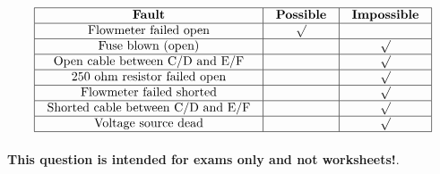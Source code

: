 






$$\vbox{\offinterlineskip
\halign{\strut
\vrule \quad\hfil # \ \hfil & 
\vrule \quad\hfil # \ \hfil & 
\vrule \quad\hfil # \ \hfil \vrule \cr
\noalign{\hrule}
%
{\bf Fault} & {\bf Possible} & {\bf Impossible} \cr
%
\noalign{\hrule}
%
Flowmeter failed open & $\surd$ &  \cr
%
\noalign{\hrule}
%
Fuse blown (open) &  & $\surd$ \cr
%
\noalign{\hrule}
%
Open cable between C/D and E/F &  & $\surd$ \cr
%
\noalign{\hrule}
%
250 ohm resistor failed open &  & $\surd$ \cr
%
\noalign{\hrule}
%
Flowmeter failed shorted &  & $\surd$ \cr
%
\noalign{\hrule}
%
Shorted cable between C/D and E/F &  & $\surd$ \cr
%
\noalign{\hrule}
%
Voltage source dead &  & $\surd$ \cr
%
\noalign{\hrule}
} %
}$$ %








{\bf This question is intended for exams only and not worksheets!}.



